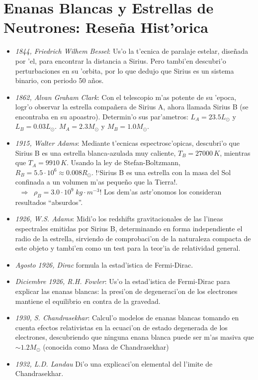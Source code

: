 \chapter{Enanas Blancas y Estrellas de Neutrones: Rese\~na Hist'orica}

\begin{itemize}
 \item \emph{1844, Friedrich Wilhem Bessel}: Us'o la t'ecnica de paralaje estelar, dise\~nada por 'el, para encontrar la distancia a Sirius. Pero tambi'en descubri'o perturbaciones en su 'orbita, por lo que dedujo que Sirius es un sistema binario, con periodo 50 a\~nos.
\item \emph{1862, Alvan Graham Clark}: Con el telescopio m'as potente de su 'epoca, logr'o observar la estrella compa\~nera de Sirius A, ahora llamada Sirius B (se encontraba en su apoastro). Determin'o sus par'ametros: $L_A=23.5L_{\odot}$ y  $L_B=0.03L_{\odot}$. $M_A=2.3M_{\odot}$ y $M_B =1.0M_{\odot}$.
\item \emph{1915, Walter Adams}: Mediante t'ecnicas espectrosc'opicas, descubri'o que Sirius B es una estrella blanca-azulada muy caliente, $T_B=27000\,K$, mientras que $T_A=9910\,K$. Usando la ley de Stefan-Boltzmann, $R_B=5.5\cdot10^{6}\approx0.008R_{\odot}$. !`Sirius B es una estrella con la masa del Sol confinada a un volumen m'as peque\~no que la Tierra!.$\;\;\Rightarrow\;\;\rho_B=3.0\cdot10^{9}\;kg\cdot m^{-3}$! Los dem'as astr'onomos los consideran resultados ``absurdos''.
\item \emph{1926, W.S. Adams}: Midi'o los redshifts gravitacionales de las l'ineas espectrales emitidas por Sirius B, determinando en forma independiente el radio de la estrella, sirviendo de comprobaci'on de la naturaleza compacta de este objeto y tambi'en como un test para la teor'ia de relatividad general.
\item \emph{Agosto 1926, Dirac} formula la estad'istica de Fermi-Dirac.
\item \emph{Diciembre 1926, R.H. Fowler}: Us'o la estad'istica de Fermi-Dirac para explicar las enanas blancas: la presi'on de degeneraci'on de los electrones mantiene el equilibrio en contra de la gravedad.
\item \emph{1930, S. Chandrasekhar}: Calcul'o modelos de enanas blancas tomando en cuenta efectos relativistas en la ecuaci'on de estado degenerada de los electrones, descubriendo que ninguna enana blanca puede ser m'as masiva que $\sim1.2 M_{\odot}$ (conocida como Masa de Chandrasekhar)
\item \emph{1932, L.D. Landau} Di'o una explicaci'on elemental del l'imite de Chandrasekhar.

\end{itemize}
